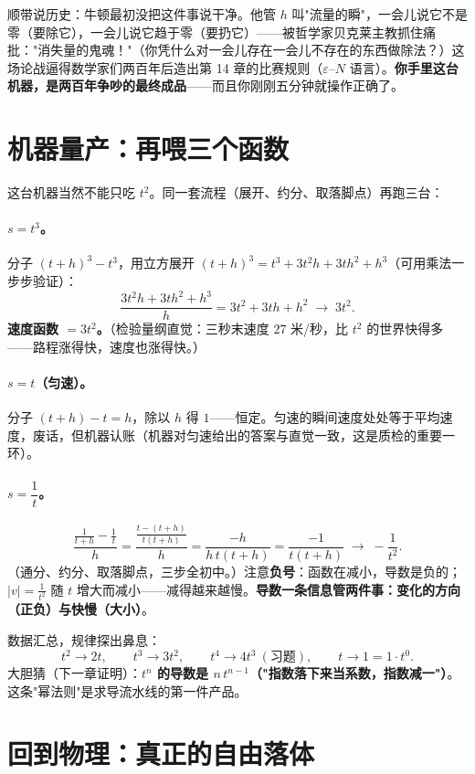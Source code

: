 顺带说历史：牛顿最初没把这件事说干净。他管 $h$ 叫"流量的瞬"，一会儿说它不是零（要除它），一会儿说它趋于零（要扔它）——被哲学家贝克莱主教抓住痛批："消失量的鬼魂！"（你凭什么对一会儿存在一会儿不存在的东西做除法？）这场论战逼得数学家们两百年后造出第 14 章的比赛规则（$\varepsilon$--$N$ 语言）。\textbf{你手里这台机器，是两百年争吵的最终成品}——而且你刚刚五分钟就操作正确了。

\section{机器量产：再喂三个函数}

这台机器当然不能只吃 $t^2$。同一套流程（展开、约分、取落脚点）再跑三台：

\paragraph{$s = t^3$。}分子 $(t+h)^3 - t^3$，用立方展开 $(t+h)^3 = t^3 + 3t^2h + 3th^2 + h^3$（可用乘法一步步验证）：
\[
\frac{3t^2h + 3th^2 + h^3}{h} = 3t^2 + 3th + h^2 \;\longrightarrow\; 3t^2 .
\]
\textbf{速度函数 $= 3t^2$。}（检验量纲直觉：三秒末速度 $27$ 米/秒，比 $t^2$ 的世界快得多——路程涨得快，速度也涨得快。）

\paragraph{$s = t$（匀速）。}分子 $(t+h) - t = h$，除以 $h$ 得 $1$——恒定。匀速的瞬间速度处处等于平均速度，废话，但机器认账（机器对匀速给出的答案与直觉一致，这是质检的重要一环）。

\paragraph{$s = \dfrac{1}{t}$。}
\[
\frac{\frac{1}{t+h} - \frac1t}{h} = \frac{\frac{t - (t+h)}{t(t+h)}}{h} = \frac{-h}{h\,t(t+h)} = \frac{-1}{t(t+h)} \;\longrightarrow\; -\frac{1}{t^2} .
\]
（通分、约分、取落脚点，三步全初中。）注意\textbf{负号}：函数在减小，导数是负的；$|v| = \tfrac1{t^2}$ 随 $t$ 增大而减小——减得越来越慢。\textbf{导数一条信息管两件事：变化的方向（正负）与快慢（大小）}。

数据汇总，规律探出鼻息：
\[
t^2 \to 2t, \qquad t^3 \to 3t^2, \qquad t^4 \to 4t^3\ (\text{习题}),\qquad t \to 1 = 1\cdot t^0 .
\]
大胆猜（下一章证明）：\textbf{$t^n$ 的导数是 $n\,t^{n-1}$（"指数落下来当系数，指数减一"）}。这条"幂法则"是求导流水线的第一件产品。

\section{回到物理：真正的自由落体}

